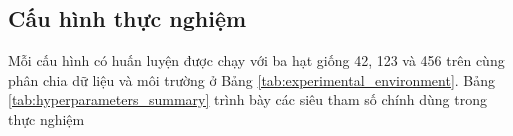 \subsection{Cấu hình thực nghiệm}
\label{sec:experimental_setup}
Mỗi cấu hình có huấn luyện được chạy với ba hạt giống 42, 123 và 456 trên cùng phân chia dữ liệu và môi trường ở Bảng \ref{tab:experimental_environment}. Bảng \ref{tab:hyperparameters_summary} trình bày các siêu tham số chính dùng trong thực nghiệm

\begin{table}[H]
\centering
{}
\caption{Môi trường thực nghiệm}
\label{tab:experimental_environment}
\end{table}

